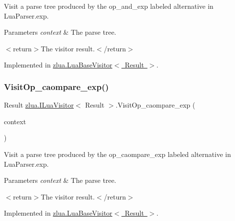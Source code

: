 Visit a parse tree produced by the {\ttfamily op\+\_\+and\+\_\+exp} labeled alternative in Lua\+Parser.\+exp. 


\begin{DoxyParams}{Parameters}
{\em context} & The parse tree.\\
\hline
\end{DoxyParams}
$<$return$>$The visitor result.$<$/return$>$ 

Implemented in \mbox{\hyperlink{classzlua_1_1_lua_base_visitor_a44cd305cf8712913e46a7ed7171206d7}{zlua.\+Lua\+Base\+Visitor$<$ Result $>$}}.

\mbox{\label{interfacezlua_1_1_i_lua_visitor_ae6cb562355272f719cb822a673909baa}} 
\subsubsection{\texorpdfstring{Visit\+Op\+\_\+caompare\+\_\+exp()}{VisitOp\_caompare\_exp()}}
{\footnotesize\ttfamily Result \mbox{\hyperlink{interfacezlua_1_1_i_lua_visitor}{zlua.\+I\+Lua\+Visitor}}$<$ Result $>$.Visit\+Op\+\_\+caompare\+\_\+exp (\begin{DoxyParamCaption}\item[{\mbox{[}\+Not\+Null\mbox{]} \mbox{\hyperlink{classzlua_1_1_lua_parser_1_1_op__caompare__exp_context}{Lua\+Parser.\+Op\+\_\+caompare\+\_\+exp\+Context}}}]{context }\end{DoxyParamCaption})}



Visit a parse tree produced by the {\ttfamily op\+\_\+caompare\+\_\+exp} labeled alternative in Lua\+Parser.\+exp. 


\begin{DoxyParams}{Parameters}
{\em context} & The parse tree.\\
\hline
\end{DoxyParams}
$<$return$>$The visitor result.$<$/return$>$ 

Implemented in \mbox{\hyperlink{classzlua_1_1_lua_base_visitor_aff0d9ab4eaa061d503aa4f0b644551e6}{zlua.\+Lua\+Base\+Visitor$<$ Result $>$}}.

\mbox{\label{interfacezlua_1_1_i_lua_visitor_a5bb37038393d66e86ab98277a7df1f70}} 
